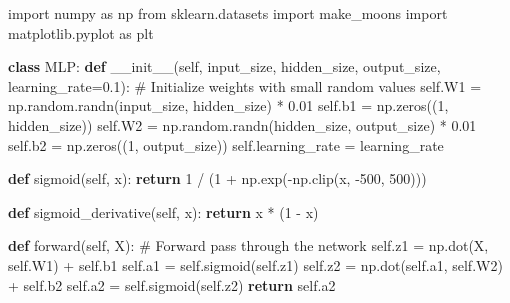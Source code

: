 \documentclass[
  letterpaper,
  DIV=11,
  numbers=noendperiod]{scrreprt}
\newenvironment{Shaded}{\begin{snugshade}}{\end{snugshade}}
\newcommand{\CommentTok}[1]{\textcolor[rgb]{0.37,0.37,0.37}{#1}}
\newcommand{\ControlFlowTok}[1]{\textcolor[rgb]{0.00,0.23,0.31}{\textbf{#1}}}
\newcommand{\DecValTok}[1]{\textcolor[rgb]{0.68,0.00,0.00}{#1}}
\newcommand{\FloatTok}[1]{\textcolor[rgb]{0.68,0.00,0.00}{#1}}
\newcommand{\FunctionTok}[1]{\textcolor[rgb]{0.28,0.35,0.67}{#1}}
\newcommand{\ImportTok}[1]{\textcolor[rgb]{0.00,0.46,0.62}{#1}}
\newcommand{\KeywordTok}[1]{\textcolor[rgb]{0.00,0.23,0.31}{\textbf{#1}}}
\newcommand{\NormalTok}[1]{\textcolor[rgb]{0.00,0.23,0.31}{#1}}
\newcommand{\OperatorTok}[1]{\textcolor[rgb]{0.37,0.37,0.37}{#1}}
\newcommand{\VariableTok}[1]{\textcolor[rgb]{0.07,0.07,0.07}{#1}}
\begin{document}
\begin{Shaded}
\begin{Highlighting}[]
\ImportTok{import}\NormalTok{ numpy }\ImportTok{as}\NormalTok{ np}
\ImportTok{from}\NormalTok{ sklearn.datasets }\ImportTok{import}\NormalTok{ make\_moons}
\ImportTok{import}\NormalTok{ matplotlib.pyplot }\ImportTok{as}\NormalTok{ plt}

\KeywordTok{class}\NormalTok{ MLP:}
    \KeywordTok{def} \FunctionTok{\_\_init\_\_}\NormalTok{(}\VariableTok{self}\NormalTok{, input\_size, hidden\_size, output\_size, learning\_rate}\OperatorTok{=}\FloatTok{0.1}\NormalTok{):}
        \CommentTok{\# Initialize weights with small random values}
        \VariableTok{self}\NormalTok{.W1 }\OperatorTok{=}\NormalTok{ np.random.randn(input\_size, hidden\_size) }\OperatorTok{*} \FloatTok{0.01}
        \VariableTok{self}\NormalTok{.b1 }\OperatorTok{=}\NormalTok{ np.zeros((}\DecValTok{1}\NormalTok{, hidden\_size))}
        \VariableTok{self}\NormalTok{.W2 }\OperatorTok{=}\NormalTok{ np.random.randn(hidden\_size, output\_size) }\OperatorTok{*} \FloatTok{0.01}
        \VariableTok{self}\NormalTok{.b2 }\OperatorTok{=}\NormalTok{ np.zeros((}\DecValTok{1}\NormalTok{, output\_size))}
        \VariableTok{self}\NormalTok{.learning\_rate }\OperatorTok{=}\NormalTok{ learning\_rate}
    
    \KeywordTok{def}\NormalTok{ sigmoid(}\VariableTok{self}\NormalTok{, x):}
        \ControlFlowTok{return} \DecValTok{1} \OperatorTok{/}\NormalTok{ (}\DecValTok{1} \OperatorTok{+}\NormalTok{ np.exp(}\OperatorTok{{-}}\NormalTok{np.clip(x, }\OperatorTok{{-}}\DecValTok{500}\NormalTok{, }\DecValTok{500}\NormalTok{)))}
    
    \KeywordTok{def}\NormalTok{ sigmoid\_derivative(}\VariableTok{self}\NormalTok{, x):}
        \ControlFlowTok{return}\NormalTok{ x }\OperatorTok{*}\NormalTok{ (}\DecValTok{1} \OperatorTok{{-}}\NormalTok{ x)}
    
    \KeywordTok{def}\NormalTok{ forward(}\VariableTok{self}\NormalTok{, X):}
        \CommentTok{\# Forward pass through the network}
        \VariableTok{self}\NormalTok{.z1 }\OperatorTok{=}\NormalTok{ np.dot(X, }\VariableTok{self}\NormalTok{.W1) }\OperatorTok{+} \VariableTok{self}\NormalTok{.b1}
        \VariableTok{self}\NormalTok{.a1 }\OperatorTok{=} \VariableTok{self}\NormalTok{.sigmoid(}\VariableTok{self}\NormalTok{.z1)}
        \VariableTok{self}\NormalTok{.z2 }\OperatorTok{=}\NormalTok{ np.dot(}\VariableTok{self}\NormalTok{.a1, }\VariableTok{self}\NormalTok{.W2) }\OperatorTok{+} \VariableTok{self}\NormalTok{.b2}
        \VariableTok{self}\NormalTok{.a2 }\OperatorTok{=} \VariableTok{self}\NormalTok{.sigmoid(}\VariableTok{self}\NormalTok{.z2)}
        \ControlFlowTok{return} \VariableTok{self}\NormalTok{.a2}
    

\end{Highlighting}
\end{Shaded}
\end{document}
